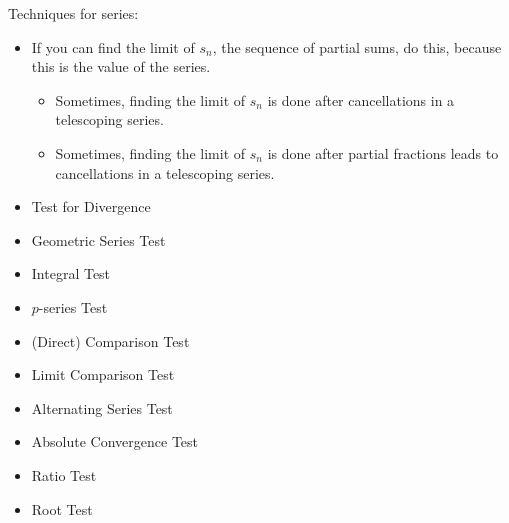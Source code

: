 \documentclass{article}
\begin{document}
\newpage

\noindent
Techniques for series:
\begin{itemize}
\item If you can find the limit of $s_n$, the sequence of partial sums, do this, because this is the value of the series.
\begin{itemize}
\item Sometimes, finding the limit of $s_n$ is done after cancellations in a telescoping series.
\item Sometimes, finding the limit of $s_n$ is done after partial fractions leads to cancellations in a telescoping series.
\end{itemize}
\item Test for Divergence
\item Geometric Series Test
\item Integral Test
\item $p$-series Test
\item (Direct) Comparison Test
\item Limit Comparison Test
\item Alternating Series Test
\item Absolute Convergence Test
\item Ratio Test
\item Root Test
\end{itemize}
\end{document}
